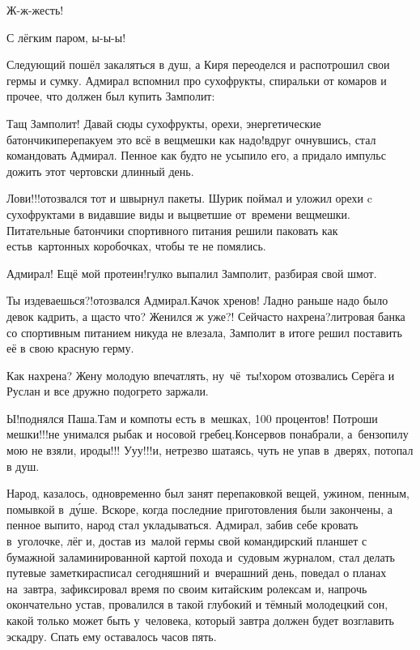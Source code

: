 \diagdash Ж-ж-жесть! 

\diagdash С лёгким паром, ы-ы-ы!

Следующий пошёл закаляться в душ, а Киря переоделся и распотрошил свои гермы и сумку. Адмирал вспомнил про сухофрукты, спиральки от комаров и прочее, что должен был купить Замполит:

\diagdash Тащ Замполит! Давай сюды сухофрукты, орехи, энергетические батончики\mdash перепакуем это всё в вещмешки как надо!\mdash вдруг очнувшись, стал командовать Адмирал. Пенное как будто не усыпило его, а придало импульс дожить этот чертовски длинный день. 

\diagdash Лови!!!\mdash отозвался тот и швырнул пакеты. Шурик поймал и уложил орехи c сухофруктами в видавшие виды и выцветшие от~времени вещмешки. Питательные батончики спортивного питания решили паковать как есть\mdash в~картонных коробочках, чтобы те не помялись.

\diagdash Адмирал! Ещё мой протеин!\mdash гулко выпалил Замполит, разбирая свой шмот.

\diagdash Ты издеваешься?!\mdash отозвался Адмирал.\mdash Качок хренов! Ладно раньше надо было девок кадрить, а щас\sdash то что? Женился ж уже?! Сейчас\sdash то нахрена?\sdash литровая банка со спортивным питанием никуда не влезала, Замполит в итоге решил поставить её в свою красную герму.

\diagdash Как нахрена? Жену молодую впечатлять, ну~чё~ты!\mdash хором отозвались Серёга и Руслан и все дружно подогрето заржали.

\diagdash Ы!\mdash поднялся Паша.\mdash Там и компоты есть в~мешках, 100 процентов! Потроши мешки!!!\mdash не унимался рыбак и носовой гребец.\mdash Консервов понабрали, а~бензопилу мою не взяли, ироды!!! У\sdash у\sdash у!!!\mdash и, нетрезво шатаясь, чуть не упав в~дверях, потопал в душ.

Народ, казалось, одновременно был занят перепаковкой вещей, ужином, пенным, помывкой в~д\'{у}ше. Вскоре, когда последние приготовления были закончены, а пенное выпито, народ стал укладываться. Адмирал, забив себе кровать в~уголочке, лёг и, достав из~малой гермы свой командирский планшет с бумажной заламинированной картой похода и~судовым журналом, стал делать путевые заметки\mdash расписал сегодняшний и~вчерашний день, поведал о планах на~завтра, зафиксировал время по своим китайским ролексам и, напрочь окончательно устав, провалился в такой глубокий и тёмный молодецкий сон, какой только может быть у~человека, который завтра должен будет возглавить эскадру. Спать ему оставалось часов пять.

\begin{center}
\end{center}

 






